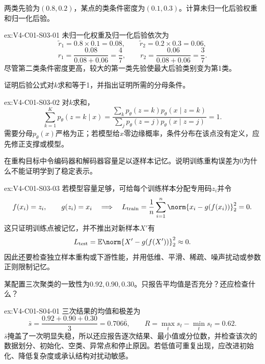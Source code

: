 \begin{SLChapterExercisePairSection}
\begin{exercise}\label{ex:V4-C01-S03-01}
两类先验为$(0.8,0.2)$，某点的类条件密度为$(0.1,0.3)$。计算未归一化后验权重和归一化后验。
\end{exercise}
\ifSLFullEdition
{}\label{sol:V4-C01-S03-01}
\begin{chapterexercisesolution}{ex:V4-C01-S03-01}
未归一化权重及归一化后验依次为
\[
\widetilde r_1=0.8\times0.1=0.08,
\qquad
\widetilde r_2=0.2\times0.3=0.06,
\]
\[
r_1=\frac{0.08}{0.08+0.06}=\frac47,
\qquad
r_2=\frac{0.06}{0.08+0.06}=\frac37.
\]
尽管第二类条件密度更高，较大的第一类先验使最大后验类别变为第1类。
\end{chapterexercisesolution}
\fi

\begin{exercise}\label{ex:V4-C01-S03-02}
证明后验公式对$k$求和等于1，并指出证明所需的分母条件。
\end{exercise}
\ifSLFullEdition
{}\label{sol:V4-C01-S03-02}
\begin{chapterexercisesolution}{ex:V4-C01-S03-02}
对$k$求和，
\[
\sum_{k=1}^{K}p_\theta(z=k\mid x)
=\frac{\sum_kp_\theta(z=k)p_\theta(x\mid z=k)}
{\sum_jp_\theta(z=j)p_\theta(x\mid z=j)}=1.
\]
需要分母$p_\theta(x)$严格为正；若模型给$x$零边缘概率，条件分布在该点没有定义，应先修正支撑或模型。
\end{chapterexercisesolution}
\fi

\begin{exercise}\label{ex:V4-C01-S03-03}
在重构目标中令编码器和解码器容量足以逐样本记忆。说明训练重构误差为0为什么不能证明学到了稳定表示。
\end{exercise}
\ifSLFullEdition
{}\label{sol:V4-C01-S03-03}
\begin{chapterexercisesolution}{ex:V4-C01-S03-03}
若模型容量足够，可给每个训练样本分配专用码$z_i$并令
\[
f(x_i)=z_i,
\qquad
g(z_i)=x_i
\quad\Longrightarrow\quad
L_{\mathrm{train}}
=\frac1n\sum_{i=1}^{n}\norm{x_i-g(f(x_i))}_2^2=0.
\]
这只证明训练点被记忆，并不推出对新样本$X'$有
\[
L_{\mathrm{test}}=\mathbb E\norm{X'-g(f(X'))}_2^2\approx0.
\]
因此还要检查独立样本重构或下游性能，并用低维、平滑、稀疏、噪声扰动或参数正则限制记忆。
\end{chapterexercisesolution}
\fi

\begin{exercise}\label{ex:V4-C01-S04-01}
某配置三次聚类的一致性为$0.92,0.90,0.30$。只报告平均值是否充分？还应检查什么？
\end{exercise}
\ifSLFullEdition
{}\label{sol:V4-C01-S04-01}
\begin{chapterexercisesolution}{ex:V4-C01-S04-01}
三次结果的均值和极差为
\[
\bar s=\frac{0.92+0.90+0.30}{3}=0.706\overline6,
\qquad
R=\max_t s_t-\min_t s_t=0.62.
\]
$\bar s$掩盖了一次明显失稳，所以还应报告逐次结果、最小值或分位数，并检查该次的数据划分、初始化、空类、异常点和停止原因。若低值可重复出现，应改进初始化、降低复杂度或承认结构对扰动敏感。
\end{chapterexercisesolution}
\fi


\end{SLChapterExercisePairSection}
